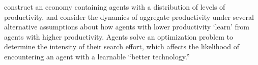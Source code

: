 \cite{lucas2014knowledge} construct an economy containing agents with a distribution of levels of productivity, and consider the dynamics of aggregate productivity under several alternative assumptions about how agents with lower productivity `learn' from agents with higher productivity.  %
Agents solve an optimization problem to determine the intensity of their search effort, which affects the likelihood of encountering an agent with a learnable ``better technology.''  %


